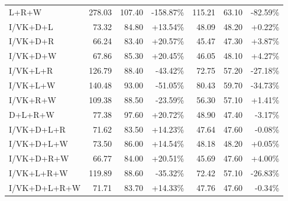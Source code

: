 \documentclass[UTF8,10pt]{ctexart}
\newcommand{\better}[1]{\textcolor{goodblue}{#1}}
\newcommand{\worse}[1]{\textcolor{badred}{#1}}
\begin{document}
{\begin{longtable}{lrrrrrr}
L+R+W & 278.03 & 107.40 & \worse{-158.87\%} & 115.21 & 63.10 & \worse{-82.59\%}\\
I/VK+D+L & 73.32 & 84.80 & \better{+13.54\%} & 48.09 & 48.20 & \better{+0.22\%}\\
I/VK+D+R & 66.24 & 83.40 & \better{+20.57\%} & 45.47 & 47.30 & \better{+3.87\%}\\
I/VK+D+W & 67.86 & 85.30 & \better{+20.45\%} & 46.05 & 48.10 & \better{+4.27\%}\\
I/VK+L+R & 126.79 & 88.40 & \worse{-43.42\%} & 72.75 & 57.20 & \worse{-27.18\%}\\
I/VK+L+W & 140.48 & 93.00 & \worse{-51.05\%} & 80.43 & 59.70 & \worse{-34.73\%}\\
I/VK+R+W & 109.38 & 88.50 & \worse{-23.59\%} & 56.30 & 57.10 & \better{+1.41\%}\\
D+L+R+W & 77.38 & 97.60 & \better{+20.72\%} & 48.90 & 47.40 & \worse{-3.17\%}\\
I/VK+D+L+R & 71.62 & 83.50 & \better{+14.23\%} & 47.64 & 47.60 & \worse{-0.08\%}\\
I/VK+D+L+W & 73.50 & 86.00 & \better{+14.54\%} & 48.18 & 48.20 & \better{+0.05\%}\\
I/VK+D+R+W & 66.77 & 84.00 & \better{+20.51\%} & 45.69 & 47.60 & \better{+4.00\%}\\
I/VK+L+R+W & 119.89 & 88.60 & \worse{-35.32\%} & 72.42 & 57.10 & \worse{-26.83\%}\\
I/VK+D+L+R+W & 71.71 & 83.70 & \better{+14.33\%} & 47.76 & 47.60 & \worse{-0.34\%}\\
\bottomrule
\end{longtable}
}
\end{document}
